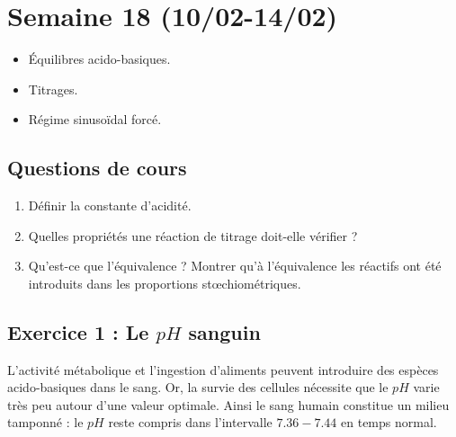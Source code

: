 \section{Semaine 18 (10/02-14/02) }


\begin{itemize}
	\item Équilibres acido-basiques.
	\item Titrages.
	\item Régime sinusoïdal forcé.
\end{itemize}

\subsection{Questions de cours}

\begin{enumerate}
	\item Définir la constante d'acidité.
	\item Quelles propriétés une réaction de titrage doit-elle vérifier ?
	\item Qu'est-ce que l'équivalence ? Montrer qu'à l'équivalence les réactifs ont été introduits dans les proportions stœchiométriques.
\end{enumerate}

\subsection{Exercice 1 : Le $pH$ sanguin}

L'activité métabolique et l'ingestion d'aliments peuvent introduire des espèces acido-basiques dans le sang. Or, la survie des cellules nécessite que le $pH$ varie très peu autour d'une valeur optimale. Ainsi le sang humain constitue un milieu tamponné : le $pH$ reste compris dans l’intervalle $7.36 - 7.44$ en temps normal.

